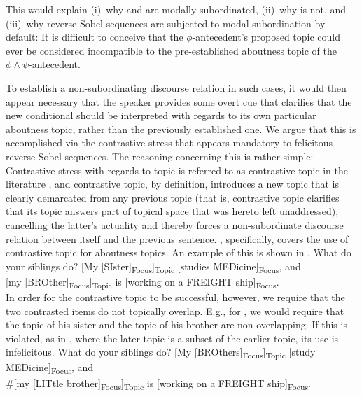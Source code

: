 This would explain (i)~why  and  are modally subordinated, (ii)~why  is not, and (iii)~why reverse Sobel sequences are subjected to modal subordination by default: It is difficult to conceive that the $\phi$-antecedent's proposed topic could ever be considered incompatible to the pre-established aboutness topic of the $\phi\land\psi$-antecedent.

To establish a non-subordinating discourse relation in such cases, it would then appear necessary that the speaker provides some overt cue that clarifies that the new conditional should be interpreted with regards to its own particular aboutness topic, rather than the previously established one. We argue that this is accomplished via the contrastive stress that appears mandatory to felicitous reverse Sobel sequences. The reasoning concerning this is rather simple: Contrastive stress with regards to topic is referred to as contrastive topic in the literature \parencite{Buring1997,Buring2003,Krifka2007,Buring2016,Constant2012}, and contrastive topic, by definition, introduces a new topic that is clearly demarcated from any previous topic (that is, contrastive topic clarifies that its topic answers part of topical space that was hereto left unaddressed), cancelling the latter's actuality \parencite{Ebert2008,Krifka2007,Ebert2014,Lee2017,vanRooij2017,Yabushita2017} and thereby forces a non-subordinate discourse relation between itself and the previous sentence. \textcite[p.~44ff]{Krifka2007}, specifically, covers the use of contrastive topic for aboutness topics. An example of this is shown in .
\pex\label{ex:krifka-cs}
\a {}What do your siblings do?
\a {}[My [\MakeUppercase{si}ster]\textsubscript{Focus}]\textsubscript{Topic} [studies \MakeUppercase{med}icine]\textsubscript{Focus},
and\\[my [\MakeUppercase{bro}ther]\textsubscript{Focus}]\textsubscript{Topic} is [working on a \MakeUppercase{freight} ship]\textsubscript{Focus}.\\\emptyfill\parencite[adapted from][p.~44]{Krifka2007}
\xe
In order for the contrastive topic to be successful, however, we require that the two contrasted items do not topically overlap. E.g., for , we would require that the topic of his sister and the topic of his brother are non-overlapping. If this is violated, as in , where the later topic is a subset of the earlier topic, its use is infelicitous.
\pex\label{ex:krifka-cs-bad}
\a {}What do your siblings do?
\a {}\phantom{\#}[My [\MakeUppercase{bro}thers]\textsubscript{Focus}]\textsubscript{Topic} [study \MakeUppercase{med}icine]\textsubscript{Focus},
and\\\#[my [\MakeUppercase{lit}tle brother]\textsubscript{Focus}]\textsubscript{Topic} is [working on a \MakeUppercase{freight} ship]\textsubscript{Focus}.\\\emptyfill\parencite[p.~267]{Krifka2007}
\xe

